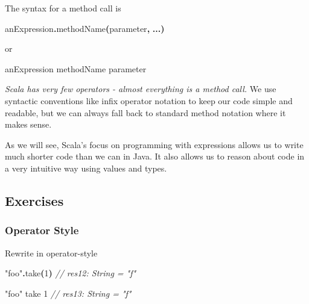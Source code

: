 \documentclass[11pt,a5paper,]{book}
\newenvironment{Shaded}{\begin{snugshade}}{\end{snugshade}}
\newcommand{\CommentTok}[1]{\textcolor[rgb]{0.56,0.35,0.01}{\textit{#1}}}
\newcommand{\DecValTok}[1]{\textcolor[rgb]{0.00,0.00,0.81}{#1}}
\newcommand{\FunctionTok}[1]{\textcolor[rgb]{0.00,0.00,0.00}{#1}}
\newcommand{\NormalTok}[1]{#1}
\newcommand{\OperatorTok}[1]{\textcolor[rgb]{0.81,0.36,0.00}{\textbf{#1}}}
\newcommand{\StringTok}[1]{\textcolor[rgb]{0.31,0.60,0.02}{#1}}
\begin{document}
The syntax for a method call is

\begin{Shaded}
\begin{Highlighting}[]
\NormalTok{anExpression}\OperatorTok{.}\FunctionTok{methodName}\OperatorTok{(}\NormalTok{parameter}\OperatorTok{,} \OperatorTok{...)}
\end{Highlighting}
\end{Shaded}

or

\begin{Shaded}
\begin{Highlighting}[]
\NormalTok{anExpression methodName parameter}
\end{Highlighting}
\end{Shaded}

\emph{Scala has very few operators - almost everything is a method
call.} We use syntactic conventions like infix operator notation to keep
our code simple and readable, but we can always fall back to standard
method notation where it makes sense.

As we will see, Scala's focus on programming with expressions allows us
to write much shorter code than we can in Java. It also allows us to
reason about code in a very intuitive way using values and types.

\hypertarget{exercises-1}{%
\subsection{Exercises}\label{exercises-1}}

\hypertarget{operator-style}{%
\subsubsection{Operator Style}\label{operator-style}}

Rewrite in operator-style

\begin{Shaded}
\begin{Highlighting}[]
\StringTok{"foo"}\OperatorTok{.}\FunctionTok{take}\OperatorTok{(}\DecValTok{1}\OperatorTok{)}
\CommentTok{// res12: String = "f"}
\end{Highlighting}
\end{Shaded}

\begin{Shaded}
\begin{Highlighting}[]
\StringTok{"foo"}\NormalTok{ take }\DecValTok{1}
\CommentTok{// res13: String = "f"}
\end{Highlighting}
\end{Shaded}
\end{document}

